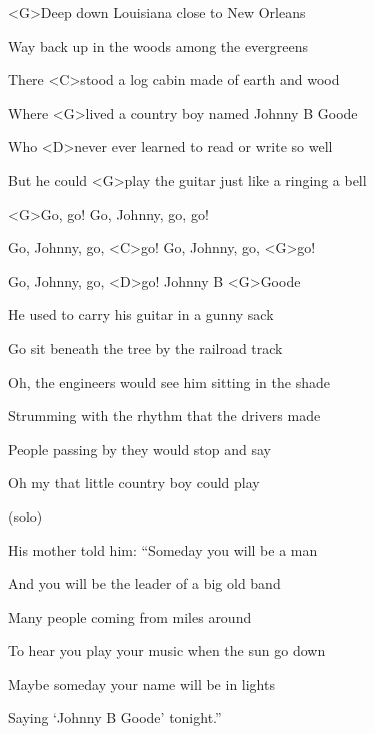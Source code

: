 
\zs
<G>Deep down Louisiana close to New Orleans

Way back up in the woods among the evergreens

There <C>stood a log cabin made of earth and wood

Where <G>lived a country boy named Johnny B Goode

Who <D>never ever learned to read or write so well

But he could <G>play the guitar just like a ringing a bell
\ks

\zr
<G>Go, go! Go, Johnny, go, go!

Go, Johnny, go, <C>go! Go, Johnny, go, <G>go!

Go, Johnny, go, <D>go! Johnny B <G>Goode
\kr

\zs
He used to carry his guitar in a gunny sack

Go sit beneath the tree by the railroad track

Oh, the engineers would see him sitting in the shade

Strumming with the rhythm that the drivers made

People passing by they would stop and say

Oh my that little country boy could play
\ks

\zr\kr

\zs (solo) \ks 

\zs
His mother told him: ``Someday you will be a man

And you will be the leader of a big old band

Many people coming from miles around

To hear you play your music when the sun go down

Maybe someday your name will be in lights

Saying `Johnny B Goode' tonight.''
\ks

\zr\kr
\kp
